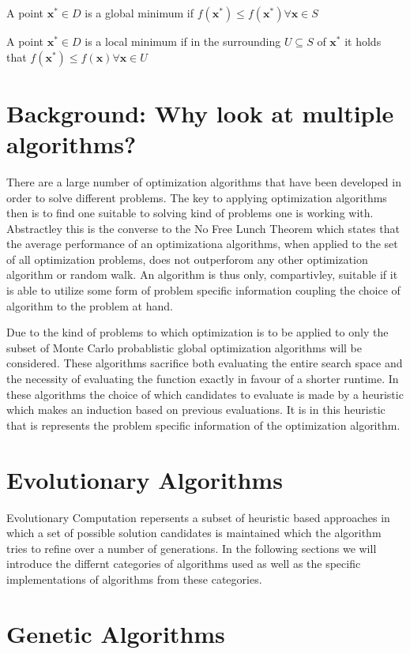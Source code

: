 \documentclass[a4paper,titlepage]{report}
\begin{document}
\noindent
A point $\mathbf{x}^* \in D$ is a global minimum if  $ f(\mathbf{x}^*) \leq f(\mathbf{x}^*)  \forall  \mathbf{x} \in S$

\noindent
A point $\mathbf{x}^* \in D$ is a local minimum if  in the surrounding  $ U \subseteq S$ of  $\mathbf{x}^*$ it holds that $f(\mathbf{x}^*)  \leq f(\mathbf{x})  \forall  \mathbf{x} \in U$


\section{Background: Why look at multiple algorithms?}
There are a large number of optimization algorithms that have been developed in order to solve different problems. The key to applying optimization algorithms then is to find one suitable to solving kind of problems one is working with. Abstractley this is the converse to the No Free Lunch Theorem which states that the average performance of an optimizationa algorithms, when applied to the set of all optimization problems,  does not outperforom any other optimization algorithm or random walk. An algorithm is thus only, compartivley, suitable if it is able to utilize some form of problem specific information coupling the choice of algorithm to the problem at hand.

Due to the kind of problems to which optimization is to be applied to only the subset of Monte Carlo probablistic global optimization algorithms will be considered. These algorithms sacrifice both evaluating the entire search space and the necessity of evaluating the function exactly in favour of a shorter runtime. In these algorithms the choice of which candidates to evaluate is made by a heuristic which makes an induction based on previous evaluations. It is in this heuristic that is represents the problem specific information of the optimization algorithm.


\section{Evolutionary Algorithms}

Evolutionary Computation repersents a subset of heuristic based approaches in which a set of possible solution candidates is maintained which the algorithm tries to refine over a number of generations. In the following sections we will introduce the differnt categories of algorithms used as well as the specific implementations of algorithms from these categories. 


\section{Genetic Algorithms}
\end{document}
